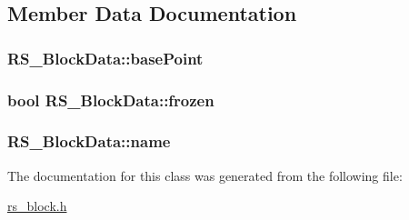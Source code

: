 \subsection{Member Data Documentation}
\hypertarget{class_r_s___block_data_a48e8b52396213dc65ceecd452404d918}{
\subsubsection[{base\-Point}]{ R\-S\-\_\-\-Block\-Data\-::base\-Point}}\label{class_r_s___block_data_a48e8b52396213dc65ceecd452404d918}
\hypertarget{class_r_s___block_data_af39bcee20f02c196357a8fe84104cf1d}{
\subsubsection[{frozen}]{\setlength{\rightskip}{0pt plus 5cm}bool R\-S\-\_\-\-Block\-Data\-::frozen}}\label{class_r_s___block_data_af39bcee20f02c196357a8fe84104cf1d}
\hypertarget{class_r_s___block_data_a763a179ac8c28d3582e1edb8b46561a6}{
\subsubsection[{name}]{ R\-S\-\_\-\-Block\-Data\-::name}}\label{class_r_s___block_data_a763a179ac8c28d3582e1edb8b46561a6}


The documentation for this class was generated from the following file\-:\begin{DoxyCompactItemize}
\item 
\hyperlink{rs__block_8h}{rs\-\_\-block.\-h}\end{DoxyCompactItemize}
